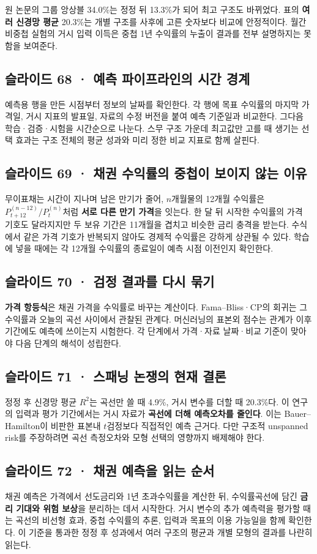 \documentclass[11pt,a4paper]{article}
\begin{document}
원 논문의 그룹 앙상블 34.0\%는 정정 뒤 13.3\%가 되어 최고 구조도 바뀌었다. 표의 \textbf{여러 신경망 평균} 20.3\%는 개별 구조를 사후에 고른 숫자보다 비교에 안정적이다. 월간 비중첩 실험의 거시 입력 이득은 중첩 1년 수익률의 누출이 결과를 전부 설명하지는 못함을 보여준다.\par

\subsection{슬라이드 68 · 예측 파이프라인의 시간 경계}
예측용 행을 만든 시점부터 정보의 날짜를 확인한다. 각 행에 목표 수익률의 마지막 가격일, 거시 지표의 발표일, 자료의 수정 버전을 붙여 예측 기준일과 비교한다. 그다음 학습·검증·시험을 시간순으로 나눈다. 스무 구조 가운데 최고값만 고를 때 생기는 선택 효과는 구조 전체의 평균 성과와 미리 정한 비교 지표로 함께 살핀다.\par

\subsection{슬라이드 69 · 채권 수익률의 중첩이 보이지 않는 이유}
무이표채는 시간이 지나며 남은 만기가 줄어, $n$개월물의 12개월 수익률은 $P_{t+12}^{(n-12)}/P_t^{(n)}$처럼 \textbf{서로 다른 만기 가격}을 잇는다. 한 달 뒤 시작한 수익률의 가격 기호도 달라지지만 두 보유 기간은 11개월을 겹치고 비슷한 금리 충격을 받는다. 수식에서 같은 가격 기호가 반복되지 않아도 경제적 수익률은 강하게 상관될 수 있다. 학습에 넣을 때에는 각 12개월 수익률의 종료일이 예측 시점 이전인지 확인한다.\par

\subsection{슬라이드 70 · 검정 결과를 다시 묶기}
\textbf{가격 항등식}은 채권 가격을 수익률로 바꾸는 계산이다. Fama–Bliss·CP의 회귀는 그 수익률과 오늘의 곡선 사이에서 관찰된 관계다. 머신러닝의 표본외 점수는 관계가 이후 기간에도 예측에 쓰이는지 시험한다. 각 단계에서 가격·자료 날짜·비교 기준이 맞아야 다음 단계의 해석이 성립한다.\par

\subsection{슬라이드 71 · 스패닝 논쟁의 현재 결론}
정정 후 신경망 평균 $R^2$는 곡선만 쓸 때 4.9\%, 거시 변수를 더할 때 20.3\%다. 이 연구의 입력과 평가 기간에서는 거시 자료가 \textbf{곡선에 더해 예측오차를 줄인다}. 이는 Bauer–Hamilton이 비판한 표본내 $t$검정보다 직접적인 예측 근거다. 다만 구조적 unspanned risk를 주장하려면 곡선 측정오차와 모형 선택의 영향까지 배제해야 한다.\par

\subsection{슬라이드 72 · 채권 예측을 읽는 순서}
채권 예측은 가격에서 선도금리와 1년 초과수익률을 계산한 뒤, 수익률곡선에 담긴 \textbf{금리 기대와 위험 보상}을 분리하는 데서 시작한다. 거시 변수의 추가 예측력을 평가할 때는 곡선의 비선형 효과, 중첩 수익률의 추론, 입력과 목표의 이용 가능일을 함께 확인한다. 이 기준을 통과한 정정 후 성과에서 여러 구조의 평균과 개별 모형의 결과를 나란히 읽는다.\par
\end{document}
